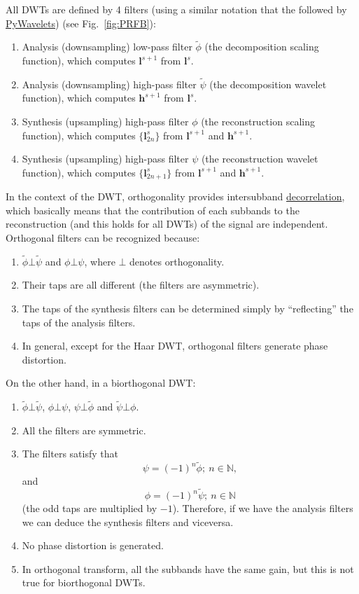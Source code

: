 All DWTs are defined by 4 filters (using a similar notation that the
followed by \href{https://pywavelets.readthedocs.io}{PyWavelets}) (see
Fig.~\ref{fig:PRFB}):
\begin{enumerate}
\item Analysis (downsampling) low-pass filter $\tilde\phi$ (the
  decomposition scaling function), which computes ${\mathbf l}^{s+1}$
  from ${\mathbf l}^s$.
\item Analysis (downsampling) high-pass filter $\tilde\psi$ (the
  decomposition wavelet function), which computes ${\mathbf h}^{s+1}$
  from ${\mathbf l}^s$.
\item Synthesis (upsampling) high-pass filter $\phi$ (the
  reconstruction scaling function), which computes $\{{\mathbf
    l}^s_{2n}\}$ from ${\mathbf l}^{s+1}$ and ${\mathbf h}^{s+1}$.
\item Synthesis (upsampling) high-pass filter $\psi$ (the
  reconstruction wavelet function), which computes $\{{\mathbf
    l}^s_{2n+1}\}$ from ${\mathbf l}^{s+1}$ and ${\mathbf h}^{s+1}$.
\end{enumerate}

In the context of the DWT, orthogonality provides intersubband
\href{https://en.wikipedia.org/wiki/Decorrelation}{decorrelation},
which basically means that the contribution of each subbands to the
reconstruction (and this holds for all DWTs) of the signal are
independent. Orthogonal filters can be recognized because:
\begin{enumerate}
\item $\tilde\phi\bot\tilde\psi$ and $\phi\bot\psi$, where $\bot$
  denotes orthogonality.
\item Their taps are all different (the filters are asymmetric).
\item The taps of the synthesis filters can be determined simply by
  ``reflecting'' the taps of the analysis filters.
\item In general, except for the Haar DWT, orthogonal filters generate
  phase distortion.
\end{enumerate}

On the other hand, in a biorthogonal DWT:
\begin{enumerate}
\item $\tilde\phi\bot\tilde\psi$, $\phi\bot\psi$, $\psi\bot\tilde\phi$
  and $\tilde\psi\bot\phi$.
\item All the filters are symmetric.
\item The filters satisfy that
  \begin{equation}
    \psi=(-1)^n\tilde\phi;~n\in\mathbb{N},
  \end{equation}
  and
  \begin{equation}
    \phi=(-1)^n\tilde\psi;~n\in\mathbb{N}
  \end{equation}
    (the odd taps are multiplied by $-1$). Therefore, if we have the
  analysis filters we can deduce the synthesis filters and viceversa.
\item No phase distortion is generated.
\item In orthogonal transform, all the subbands have the same gain,
  but this is not true for biorthogonal DWTs.
\end{enumerate}

